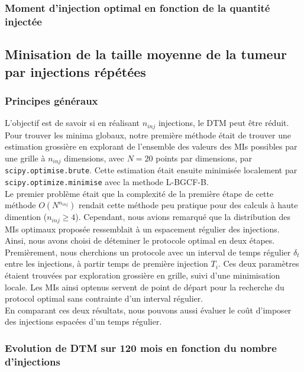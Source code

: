 \documentclass[12pt,a4paper]{article}
\begin{document}
\subsubsection{Moment d'injection optimal en fonction de la quantité injectée}

\subsection[Injections répétées]{Minisation de la taille moyenne de la tumeur par injections répétées}
\subsubsection{Principes généraux}
L'objectif est de savoir si en réalisant $n_{inj}$ injections, le \ac{DTM} peut être réduit. 
Pour trouver les minima globaux, notre première méthode était de trouver une estimation grossière en explorant de l'ensemble des valeurs des \acp{MI} possibles par une grille à $n_{inj}$ dimensions, avec $N=20$ points par dimensions, par \texttt{scipy.optimise.brute}. Cette estimation était ensuite  minimisée localement par \texttt{scipy.optimize.minimise} avec la methode L-BGCF-B\cite{}.\\
Le premier problème était que la complexité de la première étape de cette méthode $O({N}^{n_{inj}})$ rendait cette méthode peu pratique pour des calculs à haute dimention ($n_{inj}\geq4$). Cependant, nous avions remarqué que la distribution des \acp{MI} optimaux proposée ressemblait à un espacement régulier des injections. Ainsi, nous avons choisi de déteminer le protocole optimal en deux étapes. Premièrement, nous cherchions un protocole avec un interval de temps régulier $\delta_{t}$ entre les injections, à partir temps de première injection $T_{i}$. Ces deux paramètres étaient trouvées par exploration grossière en grille, suivi d'une minimisation locale. Les \acp{MI} ainsi optenus servent de point de départ pour la recherche du protocol optimal sans contrainte d'un interval régulier.\\
En comparant ces deux résultats, nous pouvons aussi évaluer le coût d'imposer des injections espacées d'un temps régulier.

\subsubsection[Injections multiples 120 mois]{Evolution de \acf{DTM} sur 120 mois en fonction du nombre d'injections}
\subsubsection{}
\end{document}
